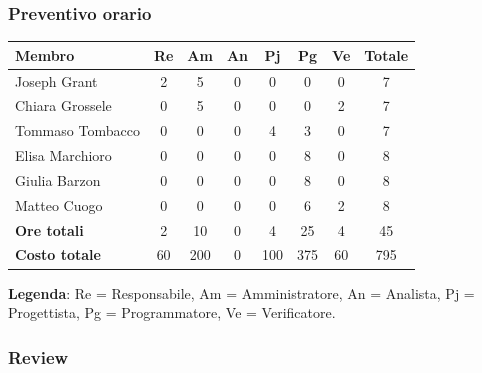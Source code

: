 \documentclass[11pt,a4paper]{article}
\begin{document}
\subsubsection{Preventivo orario}
\begin{center}
    \begin{tabular}{|l|c|c|c|c|c|c|c|}
        \hline
        \textbf{Membro} & \textbf{Re} & \textbf{Am} & \textbf{An} & \textbf{Pj} & \textbf{Pg} & \textbf{Ve} & \textbf{Totale} \\
        \hline
        Joseph Grant & 2 & 5 & 0 & 0 & 0 & 0 & 7 \\
        \hline
        Chiara Grossele & 0 & 5 & 0 & 0 & 0 & 2 & 7 \\
        \hline
        Tommaso Tombacco & 0 & 0 & 0 & 4 & 3 & 0 & 7 \\
        \hline
        Elisa Marchioro & 0 & 0 & 0 & 0 & 8 & 0 & 8 \\
        \hline
        Giulia Barzon & 0 & 0 & 0 & 0 & 8 & 0 & 8 \\
        \hline
        Matteo Cuogo & 0 & 0 & 0 & 0 & 6 & 2 & 8 \\
        \hline
        \textbf{Ore totali} & 2 & 10 & 0 & 4 & 25 & 4 & 45 \\
        \hline
        \textbf{Costo totale} & 60 & 200 & 0 & 100 & 375 & 60 & 795 \\
        \hline
    \end{tabular}
\end{center}

\noindent \textbf{Legenda}: Re = Responsabile, Am = Amministratore, An = Analista, Pj = Progettista, Pg = Programmatore, Ve = Verificatore.


\subsubsection{Review}
\end{document}
